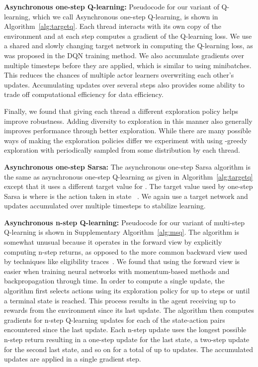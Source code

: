 \documentclass{article} \usepackage{times}
\begin{document}
\textbf{Asynchronous one-step Q-learning:}
Pseudocode for our variant of Q-learning, which we call Asynchronous one-step Q-learning, is shown in Algorithm~\ref{alg:targetq}.
Each thread interacts with its own copy of the environment and at each step computes a gradient of the Q-learning loss.
We use a shared and slowly changing target network in computing the Q-learning loss, as was proposed in the DQN training method.
We also accumulate gradients over multiple timesteps before they are applied, which is similar to using minibatches.
This reduces the chances of multiple actor learners overwriting each other's updates.
Accumulating updates over several steps also provides some ability to trade off computational efficiency for data efficiency.

Finally, we found that giving each thread a different exploration policy helps improve robustness.
Adding diversity to exploration in this manner also generally improves performance through better exploration.
While there are many possible ways of making the exploration policies differ we experiment with using -greedy exploration with  periodically sampled from some distribution by each thread.





\textbf{Asynchronous one-step Sarsa:}
The asynchronous one-step Sarsa algorithm is the same as asynchronous one-step Q-learning as given in Algorithm~\ref{alg:targetq} except that it uses a different target value for .
The target value used by one-step Sarsa is  where  is the action taken in state ~\citep{rummery1994sarsa,sutton:book}.
We again use a target network and updates accumulated over multiple timesteps to stabilize learning.





\textbf{Asynchronous n-step Q-learning:}
Pseudocode for our variant of multi-step Q-learning is shown in Supplementary Algorithm~\ref{alg:msq}.
The algorithm is somewhat unusual because it operates in the forward view by explicitly computing n-step returns, as opposed to the more common backward view used by techniques like eligibility traces~\citep{sutton:book}.
We found that using the forward view is easier when training neural networks with momentum-based methods and backpropagation through time.
In order to compute a single update, the algorithm first selects actions using its exploration policy for up to  steps or until a terminal state is reached.
This process results in the agent receiving up to  rewards from the environment since its last update.
The algorithm then computes gradients for n-step Q-learning updates for each of the state-action pairs encountered since the last update.
Each n-step update uses the longest possible n-step return resulting in a one-step update for the last state, a two-step update for the second last state, and so on for a total of up to  updates.
The accumulated updates are applied in a single gradient step.
\end{document}
